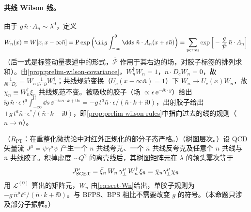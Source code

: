 \paragraph{共线 Wilson 线。}
由于 $g\,\bar n\cdot A_n\sim\lambda^0$，定义
\begin{equation}\label{eq:scet-Wn}
W_n(x)\equiv W[x,x-\infty\bar n]=\mathrm P\exp\Big(\ii g\int_{-\infty}^0\dd s\;\bar n\cdot A_n(x+s\bar n)\Big)
=\sum_{\rm perms}\exp\Big[-\frac{g}{\bar{\mathcal P}}\,\bar n\cdot A_n\Big]
\end{equation}
（后一式是标签动量表述中的形式\cite{BauerEtAl2001,BauerPirjolStewart2001}，$\bar{\mathcal P}$ 作用于其右边的场，对胶子标签的排列求和）。由\cref{prop:prelim-wilson-covariance}，$W_n^\dagger W_n=1$，$\bar n\cdot D_cW_n=0$，故 $\frac{1}{\ii\bar n\cdot D_c}=W_n\frac{1}{\ii\bar n\cdot\partial}W_n^\dagger$；共线规范变换（$U_c(x-\infty\bar n)=1$）下 $W_n\to U_c(x)W_n$，故 $\chi_n\equiv W_n^\dagger\xi_n$ 共线规范不变。被吸收的胶子（场 $\propto\epsilon\,\ee^{-\ii k\cdot y}$）给出 $\ii g\,\bar n\cdot\epsilon\,t^a\int_{-\infty}^0\dd s\,\ee^{-\ii s\bar n\cdot k+0s}=-g\,t^a\bar n\cdot\epsilon/(\bar n\cdot k+\ii0)$，出射胶子给出 $+g\,t^a\bar n\cdot\epsilon^*/(\bar n\cdot k-\ii0)$，即\cref{prop:prelim-wilson-rules}中指向过去的线的规则（$n\to\bar n$）。


\begin{proposition}\label{prop:scet-wilson}
（$R_{\mathrm{PT}}$：在重整化微扰论中对红外正规化的部分子态严格。）（树图层次。）设 QCD 矢量流 $J^\mu=\bar\psi\gamma^\mu\psi$ 产生一个 $n$ 共线夸克、一个 $\bar n$ 共线反夸克及任意个 $n$ 共线与 $\bar n$ 共线胶子。积掉虚度 $\sim Q^2$ 的离壳线后，其树图矩阵元在 $\lambda$ 的领头幂次等于
\begin{equation}\label{eq:scet-Jtree}
J^\mu_{\rm SCET}=\bar\xi_n\,W_n\,\gamma_\perp^\mu\,W_{\bar n}^\dagger\,\xi_{\bar n}=\bar\chi_n\gamma_\perp^\mu\chi_{\bar n}
\end{equation}
用 $\mathcal L^{(0)}$ 算出的矩阵元，$W_n$ 由\cref{eq:scet-Wn}给出，单胶子规则为 $-g\,\bar n^\mu t^a/(\bar n\cdot k+\ii0)$。与 BFPS、BPS 相比不需要改变 $g$ 的符号。（本命题只涉及部分子振幅。）
\end{proposition}

